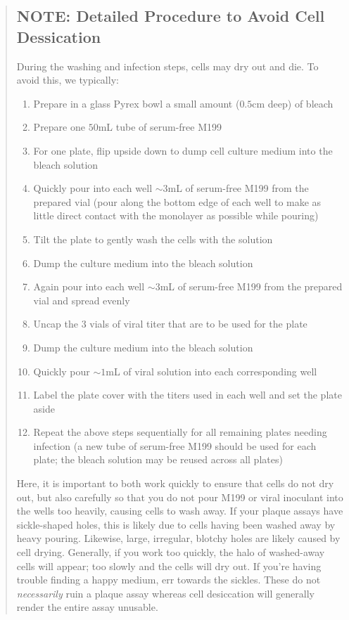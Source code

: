 \begin{quotation}
	\subsection*{NOTE: Detailed Procedure to Avoid Cell Dessication}
	
	During the washing and infection steps, cells may dry out and die. To avoid this, we typically:
	
	\begin{enumerate}
		\item Prepare in a glass Pyrex bowl a small amount ($0.5$cm deep) of bleach
		\item Prepare one $50$mL tube of serum-free M199
		\item For one plate, flip upside down to dump cell culture medium into the bleach solution
		\item Quickly pour into each well $\sim 3$mL of serum-free M199 from the prepared vial (pour along the bottom edge of each well to make as little direct contact with the monolayer as possible while pouring)
		\item Tilt the plate to gently wash the cells with the solution
		\item Dump the culture medium into the bleach solution
		\item Again pour into each well $\sim 3$mL of serum-free M199 from the prepared vial and spread evenly
		\item Uncap the 3 vials of viral titer that are to be used for the plate
		\item Dump the culture medium into the bleach solution
		\item Quickly pour $\sim 1$mL of viral solution into each corresponding well
		\item Label the plate cover with the titers used in each well and set the plate aside
		\item Repeat the above steps sequentially for all remaining plates needing infection (a new tube of serum-free M199 should be used for each plate; the bleach solution may be reused across all plates)
	\end{enumerate}
	
	Here, it is important to both work quickly to ensure that cells do not dry out, but also carefully so that you do not pour M199 or viral inoculant into the wells too heavily, causing cells to wash away. If your plaque assays have sickle-shaped holes, this is likely due to cells having been washed away by heavy pouring. Likewise, large, irregular, blotchy holes are likely caused by cell drying. Generally, if you work too quickly, the halo of washed-away cells will appear; too slowly and the cells will dry out. If you're having trouble finding a happy medium, err towards the sickles. These do not {\itshape necessarily} ruin a plaque assay whereas cell desiccation will generally render the entire assay unusable.
\end{quotation}

